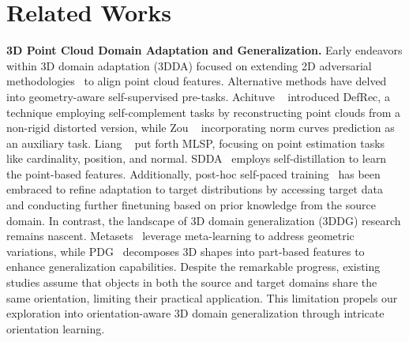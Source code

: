 \section{Related Works}


\noindent\textbf{3D Point Cloud Domain Adaptation and Generalization.}
Early endeavors within 3D domain adaptation (3DDA) focused on extending 2D adversarial methodologies~\cite{qin2019pointdan} to align point cloud features. Alternative methods have delved into geometry-aware self-supervised pre-tasks. Achituve \etal~\cite{achituve2021self} introduced DefRec, a technique employing self-complement tasks by reconstructing point clouds from a non-rigid distorted version, while Zou \etal~\cite{zou2021geometry} incorporating norm curves prediction as an auxiliary task. Liang \etal~\cite{liang2022point} put forth MLSP, focusing on point estimation tasks like cardinality, position, and normal. SDDA~\cite{cardace2023self} employs self-distillation to learn the point-based features. Additionally, post-hoc self-paced training~\cite{zou2021geometry,fan2022self,park2023pcadapter} has been embraced to refine adaptation to target distributions by accessing target data and conducting further finetuning based on prior knowledge from the source domain.
In contrast, the landscape of 3D domain generalization (3DDG) research remains nascent. Metasets~\cite{huang2021metasets} leverage meta-learning to address geometric variations, while PDG~\cite{wei2022learning} decomposes 3D shapes into part-based features to enhance generalization capabilities.
Despite the remarkable progress, existing studies assume that objects in both the source and target domains share the same orientation, limiting their practical application. This limitation propels our exploration into orientation-aware 3D domain generalization through intricate orientation learning.


